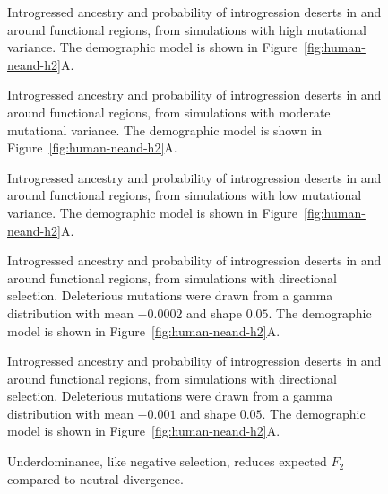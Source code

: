 \documentclass[10pt,letterpaper]{article}
\begin{document}
\begin{figure}[ht!]
    \centering
    \caption{
        Introgressed ancestry and probability of introgression deserts in and
        around functional regions, from simulations with high mutational variance.
        The demographic model is shown in Figure~\ref{fig:human-neand-h2}A.
    }
    \label{fig:deserts-high-VM}
\end{figure}

\begin{figure}[ht!]
    \centering
    \caption{
        Introgressed ancestry and probability of introgression deserts in and
        around functional regions, from simulations with moderate mutational variance.
        The demographic model is shown in Figure~\ref{fig:human-neand-h2}A.
    }
    \label{fig:deserts-med-VM}
\end{figure}

\begin{figure}[ht!]
    \centering
    \caption{
        Introgressed ancestry and probability of introgression deserts in and
        around functional regions, from simulations with low mutational variance.
        The demographic model is shown in Figure~\ref{fig:human-neand-h2}A.
    }
    \label{fig:deserts-low-VM}
\end{figure}

\begin{figure}[ht!]
    \centering
    \caption{
        Introgressed ancestry and probability of introgression deserts in and
        around functional regions, from simulations with directional selection.
        Deleterious mutations were drawn from a gamma distribution with mean
        $-0.0002$ and shape $0.05$.
        The demographic model is shown in Figure~\ref{fig:human-neand-h2}A.
    }
    \label{fig:deserts-directional-A}
\end{figure}

\begin{figure}[ht!]
    \centering
    \caption{
        Introgressed ancestry and probability of introgression deserts in and
        around functional regions, from simulations with directional selection.
        Deleterious mutations were drawn from a gamma distribution with mean
        $-0.001$ and shape $0.05$.
        The demographic model is shown in Figure~\ref{fig:human-neand-h2}A.
    }
    \label{fig:deserts-directional-B}
\end{figure}


\begin{figure}[ht!]
    \centering
    \caption{
        Underdominance, like negative selection, reduces expected $F_2$ compared
        to neutral divergence.
    }
    \label{fig:underdominance-F2}
\end{figure}
\end{document}
